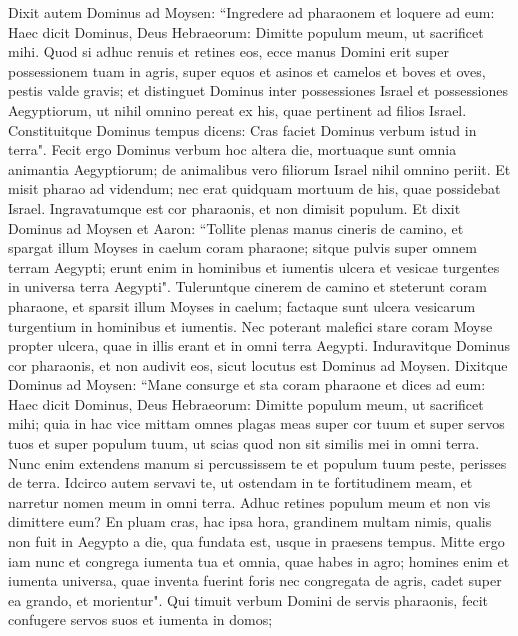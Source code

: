 \begin{biblechapter}  
\verse Dixit autem Dominus ad Moysen: “Ingredere ad pharaonem et loquere ad eum: Haec dicit Dominus, Deus Hebraeorum: Dimitte populum meum, ut sacrificet mihi. 
\verse Quod si adhuc renuis et retines eos, 
\verse ecce manus Domini erit super possessionem tuam in agris, super equos et asinos et camelos et boves et oves, pestis valde gravis; 
\verse et distinguet Dominus inter possessiones Israel et possessiones Aegyptiorum, ut nihil omnino pereat ex his, quae pertinent ad filios Israel. 
\verse Constituitque Dominus tempus dicens: Cras faciet Dominus verbum istud in terra". 
\verse Fecit ergo Dominus verbum hoc altera die, mortuaque sunt omnia animantia Aegyptiorum; de animalibus vero filiorum Israel nihil omnino periit. 
\verse Et misit pharao ad videndum; nec erat quidquam mortuum de his, quae possidebat Israel. Ingravatumque est cor pharaonis, et non dimisit populum. 
\verse Et dixit Dominus ad Moysen et Aaron: “Tollite plenas manus cineris de camino, et spargat illum Moyses in caelum coram pharaone; 
\verse sitque pulvis super omnem terram Aegypti; erunt enim in hominibus et iumentis ulcera et vesicae turgentes in universa terra Aegypti". 
\verse Tuleruntque cinerem de camino et steterunt coram pharaone, et sparsit illum Moyses in caelum; factaque sunt ulcera vesicarum turgentium in hominibus et iumentis. 
\verse Nec poterant malefici stare coram Moyse propter ulcera, quae in illis erant et in omni terra Aegypti. 
\verse Induravitque Dominus cor pharaonis, et non audivit eos, sicut locutus est Dominus ad Moysen. 
\verse Dixitque Dominus ad Moysen: “Mane consurge et sta coram pharaone et dices ad eum: Haec dicit Dominus, Deus Hebraeorum: Dimitte populum meum, ut sacrificet mihi; 
\verse quia in hac vice mittam omnes plagas meas super cor tuum et super servos tuos et super populum tuum, ut scias quod non sit similis mei in omni terra. 
\verse Nunc enim extendens manum si percussissem te et populum tuum peste, perisses de terra. 
\verse Idcirco autem servavi te, ut ostendam in te fortitudinem meam, et narretur nomen meum in omni terra. 
\verse Adhuc retines populum meum et non vis dimittere eum? 
\verse En pluam cras, hac ipsa hora, grandinem multam nimis, qualis non fuit in Aegypto a die, qua fundata est, usque in praesens tempus. 
\verse Mitte ergo iam nunc et congrega iumenta tua et omnia, quae habes in agro; homines enim et iumenta universa, quae inventa fuerint foris nec congregata de agris, cadet super ea grando, et morientur". 
\verse Qui timuit verbum Domini de servis pharaonis, fecit confugere servos suos et iumenta in domos; 

\end{biblechapter}
